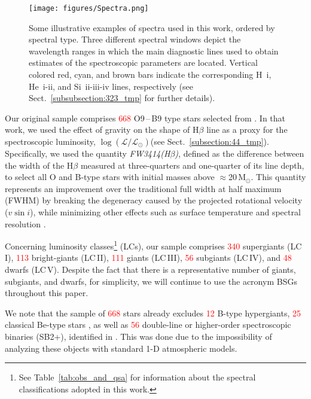 \documentclass{aa}
\newcommand{\vsini}{\mbox{$v\sin i$}\xspace}
\newcommand{\logLs}{$\log (\mathcal{L}/\mathcal{L}_{\odot})$\xspace}
\newcommand{\fwhb}{\textit{FW3414(H$\beta$)}\xspace}
\newcommand{\MSol}{\,\mbox{M$_\odot$}\xspace}
\newcommand{\num}[1]{\textcolor{red}{#1}}
\begin{document}
\begin{figure*}[t!]
\centering
\texttt{[image: figures/Spectra.png]}
\caption{Some illustrative examples of spectra used in this work, ordered by spectral type. Three different spectral windows depict the wavelength ranges in which the main diagnostic lines used to obtain estimates of the spectroscopic parameters are located. Vertical colored red, cyan, and brown bars indicate the corresponding H~{\sc i}, He~{\sc i-ii}, and Si~{\sc ii-iii-iv} lines, respectively (see Sect.~\ref{subsubsection:323_tmp} for further details).}
\label{fig:spectra}
\end{figure*}

Our original sample comprises \num{668} O9\,--\,B9 type stars selected from \citet{deburgos23}. In that work, we used the effect of gravity on the shape of H$\beta$ line as a proxy for the spectroscopic luminosity, \logLs (see Sect.~\ref{subsection:44_tmp}). Specifically, we used the quantity \fwhb, defined as the difference between the width of the H$\beta$ measured at three-quarters and one-quarter of its line depth, to select all O and B-type stars with initial masses above $\approx$20\MSol. This quantity represents an improvement over the traditional full width at half maximum (FWHM) by breaking the degeneracy caused by the projected rotational velocity (\vsini), while minimizing other effects such as surface temperature and spectral resolution \citep[see further notes in][]{deburgos23}. 

Concerning luminosity classes\footnote{See Table~\ref{tab:obs_and_qsa} for information about the spectral classifications adopted in this work.} (LCs), our sample comprises \num{340} supergiants (LC\,I), \num{113} bright-giants (LC\,II), \num{111} giants (LC\,III), \num{56} subgiants (LC\,IV), and \num{48} dwarfs (LC\,V). Despite the fact that there is a representative number of giants, subgiants, and dwarfs, for simplicity, we will continue to use the acronym BSGs throughout this paper. 

We note that the sample of \num{668} stars already excludes \num{12} B-type hypergiants, \num{25} classical Be-type stars \citep[see][and references therein]{negueruela04}, as well as \num{56} double-line or higher-order spectroscopic binaries (SB2+), identified in \citet{deburgos23}. This was done due to the impossibility of analyzing these objects with standard 1-D atmospheric models. 



\end{document}
